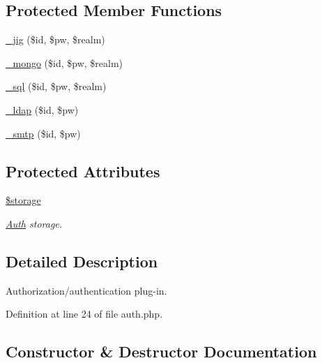 \subsection*{Protected Member Functions}
\begin{DoxyCompactItemize}
\item 
\hyperlink{class_auth_a81198296a350267473fdd52a525f1ccd}{\+\_\+jig} (\$id, \$pw, \$realm)
\item 
\hyperlink{class_auth_a4b51050fdae893312cb041b9074e1027}{\+\_\+mongo} (\$id, \$pw, \$realm)
\item 
\hyperlink{class_auth_a82093435675852de0fdcee08e43ceb74}{\+\_\+sql} (\$id, \$pw, \$realm)
\item 
\hyperlink{class_auth_a891591e9fc755d9d87903330b84d7e4f}{\+\_\+ldap} (\$id, \$pw)
\item 
\hyperlink{class_auth_af5d9f4a9f695edde6988b238a1759040}{\+\_\+smtp} (\$id, \$pw)
\end{DoxyCompactItemize}
\subsection*{Protected Attributes}
\begin{DoxyCompactItemize}
\item 
\hypertarget{class_auth_a23658d9b796eebdea4cee5c9f0046894}{}\label{class_auth_a23658d9b796eebdea4cee5c9f0046894} 
\hyperlink{class_auth_a23658d9b796eebdea4cee5c9f0046894}{\$storage}
\begin{DoxyCompactList}\small\item\em \hyperlink{class_auth}{Auth} storage. \end{DoxyCompactList}\end{DoxyCompactItemize}


\subsection{Detailed Description}
Authorization/authentication plug-\/in. 

Definition at line 24 of file auth.\+php.



\subsection{Constructor \& Destructor Documentation}
\hypertarget{class_auth_a9ca59d2216de9a1756d9886e527b3971}{}\label{class_auth_a9ca59d2216de9a1756d9886e527b3971} 
